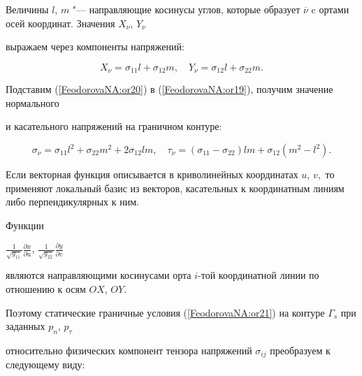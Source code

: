 Величины $l$, $m$ "--- направляющие косинусы углов, которые образует $\overline{\nu}$ c ортами осей координат. Значения $X_{\nu}$, $Y_{\nu}$

выражаем через компоненты напряжений:

\begin{equation}

\label{FeodorovaNA:or20}  X_{\nu}=\sigma_{11}l+\sigma_{12}m,

\quad 

Y_{\nu}=\sigma_{12}l+\sigma_{22} m.

\end{equation}



Подставим (\ref{FeodorovaNA:or20}) в (\ref{FeodorovaNA:or19}), получим значение нормального

и касательного напряжений на граничном контуре:

\begin{equation}

\label{FeodorovaNA:or21}

\sigma_{\nu}=\sigma_{11}l^2+\sigma_{22}m^2+2\sigma_{12}lm, \quad 

\tau_{\nu}=(\sigma_{11}-\sigma_{22})lm+\sigma_{12}(m^2-l^2).

\end{equation}

 Если векторная функция описывается в криволинейных координатах $u$, $v,$ то применяют локальный базис из векторов, касательных к координатным линиям либо перпендикулярных к ним.


Функции

$\frac{1}{\sqrt{g_{11}}}\frac{\partial x}{\partial u}$, $\frac{1}{\sqrt{g_{22}}}\frac{\partial y}{\partial v}$

являются направляющими косинусами орта $i$-той координатной линии по отношению к осям $OX$, $OY.$ 

Поэтому статические граничные условия (\ref{FeodorovaNA:or21}) на контуре $\Gamma_s$ при заданных $p_{n}$, $p_{\tau}$

относительно физических компонент тензора напряжений $\sigma_{ij}$ преобразуем к следующему виду:



